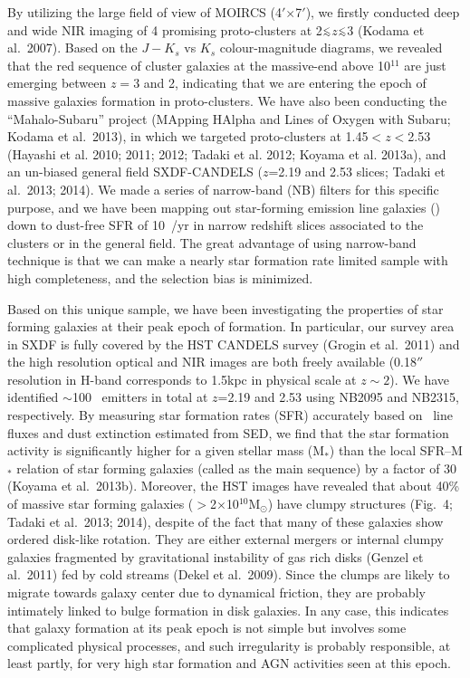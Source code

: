 By utilizing the large field of view of MOIRCS (4$'$$\times$7$'$),
we firstly conducted deep and wide NIR imaging of 4 promising proto-clusters
at 2$\lsim$$z$$\lsim$3 (Kodama et al.\ 2007).
Based on the $J-K_s$ vs $K_s$ colour-magnitude diagrams, we revealed that
the red sequence of cluster galaxies at the massive-end above 10$^{11}$\msun
are just emerging between $z=3$ and 2, indicating that we are entering the
epoch of massive galaxies formation in proto-clusters. 
We have also been conducting the ``Mahalo-Subaru'' project (MApping HAlpha and Lines
of Oxygen with Subaru; Kodama et al.\ 2013), in which we targeted proto-clusters at
1.45$<$$z$$<$2.53 (Hayashi et al. 2010; 2011; 2012; Tadaki et al. 2012;
Koyama et al. 2013a), and an un-biased general field SXDF-CANDELS 
($z$=2.19 and 2.53 slices; Tadaki et al.\ 2013; 2014).
We made a series of narrow-band (NB) filters for this specific purpose,
and we have been mapping out star-forming emission line galaxies (\ha)
down to dust-free SFR of 10~\msun/yr in narrow redshift slices associated to the clusters
or in the general field.
The great advantage of using narrow-band technique is that we can make a nearly star formation
rate limited sample with high completeness, and the selection bias is minimized.

Based on this unique sample, we have been investigating the properties of star forming
galaxies at their peak epoch of formation.
In particular, our survey area in SXDF is fully covered by the HST CANDELS survey
(Grogin et al.\ 2011)
and the high resolution optical and NIR images are both freely available
(0.18$''$ resolution in H-band corresponds to 1.5kpc in physical scale at $z\sim2$).
We have identified $\sim$100 \ha\ emitters in total at $z$=2.19 and 2.53 using NB2095 and NB2315,
respectively.
By measuring star formation rates (SFR) accurately based on \ha\ line fluxes and dust extinction
estimated from SED,
we find that the star formation activity is significantly higher for a given stellar mass (M$_{*}$)
than the local SFR--M$_{*}$ relation of star forming galaxies (called as the main sequence)
by a factor of 30 (Koyama et al.\ 2013b).
Moreover, the HST images have revealed that about 40\% of massive star forming galaxies
($>$2$\times$10$^{10}$M$_{\odot}$) have clumpy structures (Fig.\ 4; Tadaki et al.\ 2013; 2014),
despite of the fact
that many of these galaxies show ordered disk-like rotation. They are either external
mergers or internal clumpy galaxies fragmented by gravitational instability of gas rich disks
(Genzel et al.\ 2011) fed by cold streams (Dekel et al.\ 2009).
Since the clumps are likely to migrate towards galaxy center due to dynamical friction,
they are probably intimately linked to bulge formation in disk galaxies.
In any case, this indicates that galaxy formation at its peak epoch is not simple but
involves some complicated physical processes, and such irregularity is probably responsible,
at least partly, for very high star formation and AGN activities seen at this epoch.

